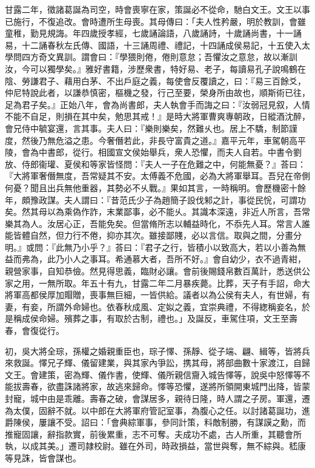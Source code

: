 \begin{pinyinscope}
甘露二年，徵諸葛誕為司空，時會喪寧在家，策誕必不從命，馳白文王。文王以事已施行，不復追改。會時遭所生母喪。其母傳曰：「夫人性矜嚴，明於教訓，會雖童稚，勤見規誨。年四歲授孝經，七歲誦論語，八歲誦詩，十歲誦尚書，十一誦易，十二誦春秋左氏傳、國語，十三誦周禮、禮記，十四誦成侯易記，十五使入太學問四方奇文異訓。謂會曰：『學猥則倦，倦則意怠；吾懼汝之意怠，故以漸訓汝，今可以獨學矣。』雅好書籍，涉歷衆書，特好易、老子，每讀易孔子說鳴鶴在陰、勞謙君子、藉用白茅、不出戶庭之義，每使會反覆讀之，曰：『易三百餘爻，仲尼特說此者，以謙恭慎密，樞機之發，行己至要，榮身所由故也，順斯術已往，足為君子矣。』正始八年，會為尚書郎，夫人執會手而誨之曰：『汝弱冠見叙，人情不能不自足，則損在其中矣，勉思其戒！』是時大將軍曹爽專朝政，日縱酒沈醉，會兄侍中毓宴還，言其事。夫人曰：『樂則樂矣，然難乆也。居上不驕，制節謹度，然後乃無危溢之患。今奢僭若此，非長守富貴之道。』嘉平元年，車駕朝高平陵，會為中書郎，從行。相國宣文侯始舉兵，衆人恐懼，而夫人自若。中書令劉放、侍郎衞瓘、夏侯和等家皆怪問：『夫人一子在危難之中，何能無憂？』荅曰：『大將軍奢僭無度，吾常疑其不安。太傅義不危國，必為大將軍舉耳。吾兒在帝側何憂？聞且出兵無他重器，其勢必不乆戰。』果如其言，一時稱明。會歷機密十餘年，頗豫政謀。夫人謂曰：『昔范氏少子為趙簡子設伐邾之計，事從民恱，可謂功矣。然其母以為乘偽作詐，末業鄙事，必不能乆。其識本深遠，非近人所言，吾常樂其為人。汝居心正，吾能免矣。但當脩所志以輔益時化，不忝先人耳。常言人誰能皆體自然，但力行不倦，抑亦其次。雖接鄙賤，必以言信。取與之間，分畫分明。』或問：『此無乃小乎？』荅曰：『君子之行，皆積小以致高大，若以小善為無益而弗為，此乃小人之事耳。希通慕大者，吾所不好。』會自幼少，衣不過青紺，親營家事，自知恭儉。然見得思義，臨財必讓。會前後賜錢帛數百萬計，悉送供公家之用，一無所取。年五十有九，甘露二年二月暴疾薨。比葬，天子有手詔，命大將軍高都侯厚加賵贈，喪事無巨細，一皆供給。議者以為公侯有夫人，有世婦，有妻，有妾，所謂外命婦也。依春秋成風、定姒之義，宜崇典禮，不得緫稱妾名，於是稱成侯命婦。殯葬之事，有取於古制，禮也。」及誕反，車駕住項，文王至壽春，會復從行。

初，吳大將全琮，孫權之婚親重臣也，琮子懌、孫靜、從子端、翩、緝等，皆將兵來救誕。懌兄子輝、儀留建業，與其家內爭訟，携其母，將部曲數十家渡江，自歸文王。會建策，密為輝、儀作書，使輝、儀所親信齎入城告懌等，說吳中怒懌等不能拔壽春，欲盡誅諸將家，故逃來歸命。懌等恐懼，遂將所領開東城門出降，皆蒙封寵，城中由是乖離。壽春之破，會謀居多，親待日隆，時人謂之子房。軍還，遷為太僕，固辭不就。以中郎在大將軍府管記室事，為腹心之任。以討諸葛誕功，進爵陳侯，屢讓不受。詔曰：「會典綜軍事，參同計策，料敵制勝，有謀謨之勳，而推寵固讓，辭指款實，前後累重，志不可奪。夫成功不處，古人所重，其聽會所執，以成其美。」遷司隷校尉。雖在外司，時政損益，當世與奪，無不綜與。嵇康等見誅，皆會謀也。


\end{pinyinscope}
